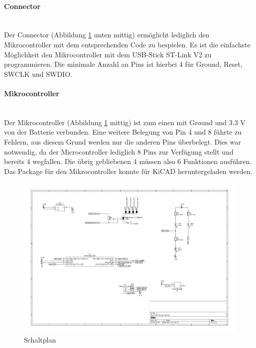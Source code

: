 \documentclass[a4paper,
DIV=13,
12pt,
BCOR=10mm,
department=FakEI,
parskip=half,
automark,
]{article}
\begin{document}
\paragraph{Connector} $~$ \\

Der Connector (Abbildung \ref{fig:Schaltplan} unten mittig) ermöglicht lediglich den Mikrocontroller mit dem entsprechenden Code zu bespielen. Es ist die einfachste Möglichkeit den Mikrocontroller mit dem USB-Stick ST-Link V2 zu programmieren. Die minimale Anzahl an Pins ist hierbei 4 für Ground, Reset, SWCLK und SWDIO.

\paragraph{Mikrocontroller} $~$ \\

Der Mikrocontroller (Abbildung \ref{fig:Schaltplan} mittig) ist zum einen mit Ground und 3.3 V von der Batterie verbunden. Eine weitere Belegung von Pin 4 und 8 führte zu Fehlern, aus diesem Grund werden nur die anderen Pins überbelegt. Dies war notwendig, da der Microcontroller lediglich 8 Pins zur Verfügung stellt und bereits 4 wegfallen. Die übrig gebliebenen 4 müssen also 6 Funktionen ausführen. Das Package für den Mikrocontroller konnte für KiCAD heruntergeladen werden.

\begin{figure}[!hbpt]
 \begin{center} \includegraphics[width=1.4\textwidth,angle=90]{Schaltplan.pdf}
 \caption{Schaltplan}
 \label{fig:Schaltplan}
  \end{center}
\end{figure}
\end{document}
